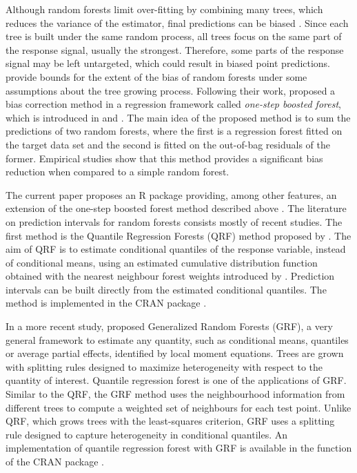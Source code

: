 Although random forests limit over-fitting by combining many trees, which reduces the variance of the estimator, final predictions can be biased \citep{mentch_quantifying_2016,wager_estimation_2018}. Since each tree is built under the same random process, all trees focus on the same part of the response signal, usually the strongest. Therefore, some parts of the response signal may be left untargeted, which could result in biased point predictions. \citet{wager_estimation_2018} provide bounds for the extent of the bias of random forests under some assumptions about the tree growing process. Following their work, \citet{ghosal_boosting_2021} proposed a bias correction method in a regression framework called \emph{one-step boosted forest}, which is introduced in \citet{breiman_random_2001} and \citet{zhang_bias-corrected_2012}. The main idea of the proposed method is to sum the predictions of two random forests, where the first is a regression forest fitted on the target data set and the second is fitted on the out-of-bag residuals of the former. Empirical studies show that this method provides a significant bias reduction when compared to a simple random forest. 

The current paper proposes an R package providing, among other features, an extension of the one-step boosted forest method described above \citep{ghosal_boosting_2021}. The literature on prediction intervals for random forests consists mostly of recent studies. The first method is the Quantile Regression Forests (QRF) method proposed by \citet{meinshausen_quantile_2006}. The aim of QRF is to estimate conditional quantiles of the response variable, instead of conditional means, using an estimated cumulative distribution function obtained with the nearest neighbour forest weights introduced by \citet{hothorn_bagging_2004}. Prediction intervals can be built directly from the estimated conditional quantiles. The method is implemented in the CRAN package  \citep{R-quantregForest}.

In a more recent study, \citet{athey_generalized_2019} proposed Generalized Random Forests (GRF), a very general framework to estimate any quantity, such as conditional means, quantiles or average partial effects, identified by local moment equations. Trees are grown with splitting rules designed to maximize heterogeneity with respect to the quantity of interest. Quantile regression forest is one of the applications of GRF. Similar to the QRF, the GRF method uses the neighbourhood information from different trees to compute a weighted set of neighbours for each test point. Unlike QRF, which grows trees with the least-squares criterion, GRF uses a splitting rule designed to capture heterogeneity in conditional quantiles. An implementation of quantile regression forest with GRF is available in the function  of the CRAN package  \citep{R-grf}.

